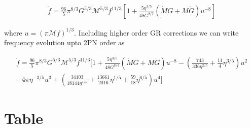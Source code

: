 \documentclass[11pt]{article}
\begin{document}
 \begin{align} 
 \dot{f}=\frac{96}{5}\pi^{8/3}G^{5/3}\mathcal{M}^{5/3}f^{11/3}[1+\frac{5\eta^{3/5}}{48 G^{8/3}}(\dot{M}G+M\dot{G})u^{-8}]
 \end{align} 
 
 where $u=(\pi \mathcal{M}f)^{1/3}$. Including higher order GR corrections we can write frequency evolution upto 2PN order as
 
 
 
 \begin{align}
 \dot{f}=\frac{96}{5}\pi^{8/3}G^{5/3}\mathcal{M}^{5/3}f^{11/3}\bigg[1+\frac{5\eta^{3/5}}{48 G^{8/3}}(\dot{M}G+M\dot{G})u^{-8}-(\frac{743}{336\eta^{2/5}}+\frac{11}{4}\eta^{3/5})u^2\\+4\pi\eta^{-3/5}u^3+(\frac{34103}{18144\eta^{4/5}}+\frac{13661}{2016}\eta^{1/5}+\frac{59}{18}\eta^{6/5})u^4\bigg]
 \end{align}
 
 
 
 \newpage
 \section{Table}
\end{document}
